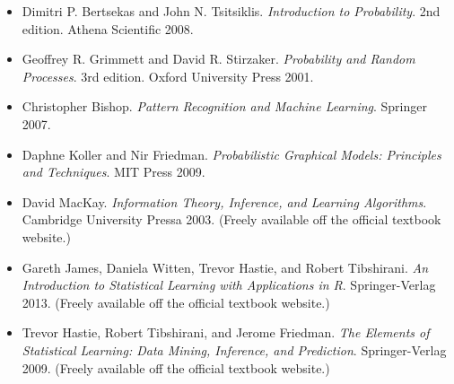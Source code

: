 \begin{itemize}
\item Dimitri P. Bertsekas and John N. Tsitsiklis. \textit{Introduction to Probability}. 2nd edition. Athena Scientific 2008.

\item Geoffrey R. Grimmett and David R. Stirzaker. \textit{Probability and Random Processes}. 3rd edition. Oxford University Press 2001.

\item Christopher Bishop. \textit{Pattern Recognition and Machine Learning}. Springer 2007.

\item Daphne Koller and Nir Friedman. \textit{Probabilistic Graphical Models: Principles and Techniques}. MIT Press 2009.

\item David MacKay. \textit{Information Theory, Inference, and Learning Algorithms}. Cambridge University Pressa 2003. (Freely available off the official textbook website.)

\item Gareth James, Daniela Witten, Trevor Hastie, and Robert Tibshirani. \textit{An Introduction to Statistical Learning with Applications in R}. Springer-Verlag 2013. (Freely available off the official textbook website.)

\item Trevor Hastie, Robert Tibshirani, and Jerome Friedman. \textit{The Elements of Statistical Learning: Data Mining, Inference, and Prediction}. Springer-Verlag 2009. (Freely available off the official textbook website.)
\end{itemize}



